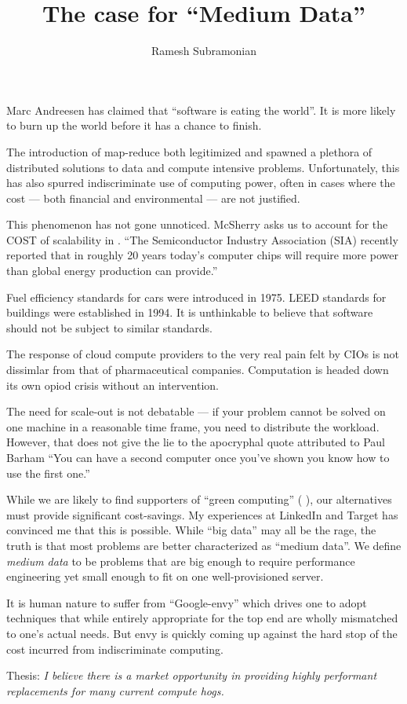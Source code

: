 \documentclass[12pt,letterpaper]{article}
\begin{document}
\title{The case for ``Medium Data''}
\author{ Ramesh Subramonian }
\maketitle
\thispagestyle{fancy}
\lhead{}
\chead{}
\rhead{}
\lfoot{}
\rfoot{{\small \thepage}}

Marc Andreesen has claimed that ``software is eating the world''. It is more
likely to burn up the world before it has a chance to finish.

The introduction of map-reduce \cite{mapreduce2004} both legitimized and spawned a plethora
of distributed solutions to data and compute intensive problems. Unfortunately,
this has also spurred indiscriminate use of computing power, often in cases
where the cost --- both financial and environmental --- are not justified.

This phenomenon has not gone unnoticed. 
McSherry asks us to account for the COST of scalability in \cite{McSherry2015}.
``The Semiconductor Industry Association (SIA)
recently reported that in roughly 20 years today’s computer chips will require
more power than global energy production can provide.'' \cite{kxblog}

Fuel efficiency standards for cars were introduced in 1975. LEED standards for
buildings were
established in 1994. It is unthinkable to believe that software should not be
subject to similar standards.

The response of cloud compute providers to the very real pain felt by CIOs is
not dissimlar from that of pharmaceutical companies. 
Computation is headed down its own opiod crisis without an intervention.


The need for scale-out is not debatable --- if your problem cannot be solved on
one machine in a reasonable time frame, you need to distribute the workload.
However, that does not give the lie to the apocryphal quote attributed to Paul
Barham ``You can have a second computer once you've
shown you know how to use the first one.”


While we are likely to find supporters of ``green computing'' (
\cite{Limits2018}), our alternatives must provide significant cost-savings. 
My experiences at LinkedIn and Target has convinced me that this is possible.
While ``big data'' may all be the rage, the truth is that most problems are
better characterized as ``medium data''. We define {\em medium data} to be
problems that are big enough to require performance engineering yet small enough
to fit on one well-provisioned server.

It is human nature to suffer from ``Google-envy'' which drives one to adopt
techniques that while entirely appropriate for the top end are wholly mismatched to one's
actual needs. But envy is quickly coming up against the hard stop of the cost
incurred from indiscriminate computing.

Thesis: {\em I believe there is a market opportunity in providing highly 
performant replacements for many current compute hogs. }


\end{document}
